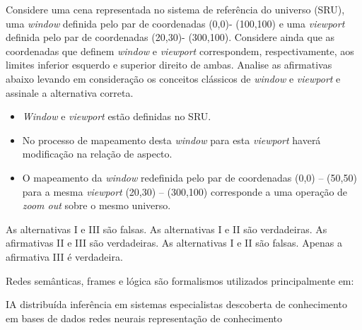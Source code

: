 \documentclass[12pt, addpoints]{exam}
\begin{document}
    \begin{questions}

    \newpage
    \question

Considere uma cena representada no sistema de referência do universo (SRU), uma \textit{window} definida pelo par de coordenadas (0,0)- (100,100) e uma \textit{viewport} definida pelo par de coordenadas (20,30)- (300,100). Considere ainda que as coordenadas que definem \textit{window} e \textit{viewport} correspondem, respectivamente, aos limites inferior esquerdo e superior direito de ambas. Analise as afirmativas abaixo levando em consideração os conceitos clássicos de \textit{window} e \textit{viewport} e assinale a alternativa correta.



\begin{itemize}

    \item[I)] \textit{Window} e \textit{viewport} estão definidas no SRU.

    \item[II)] No processo de mapeamento desta \textit{window} para esta \textit{viewport} haverá modificação na relação de aspecto.

    \item[III)] O mapeamento da \textit{window} redefinida pelo par de coordenadas (0,0) – (50,50) para a mesma \textit{viewport} (20,30) – (300,100) corresponde a uma operação de \textit{zoom out} sobre o mesmo universo.

\end{itemize}
\begin{choices}
\choice As alternativas I e III são falsas.
\choice As alternativas I e II são verdadeiras.
\choice As afirmativas II e III são verdadeiras.
\choice As alternativas I e II são falsas.
\choice Apenas a afirmativa III é verdadeira.
\end{choices}

\question

Redes semânticas, frames e lógica são formalismos utilizados principalmente em: 
\begin{choices}
\choice IA distribuída
\choice inferência em sistemas especialistas
\choice descoberta de conhecimento em bases de dados
\choice redes neurais
\choice representação de conhecimento
\end{choices}

\question


\end{questions}
\end{document}

